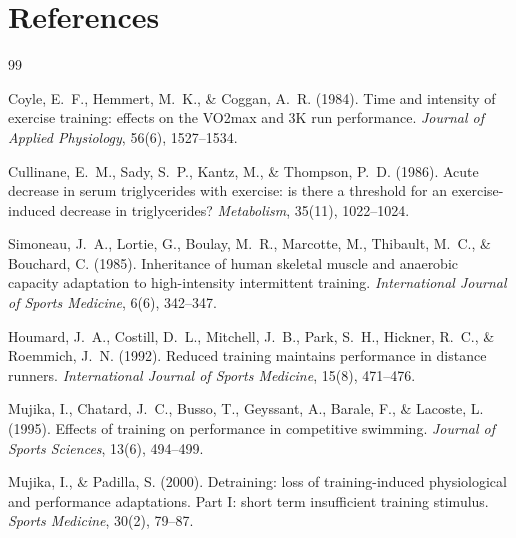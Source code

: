\documentclass[12pt,a4paper]{article}
\begin{document}
\section*{References}

\begin{thebibliography}{99}

Coyle, E.~F., Hemmert, M.~K., \& Coggan, A.~R. (1984).
Time and intensity of exercise training: effects on the VO2max and 3K run performance.
\textit{Journal of Applied Physiology}, 56(6), 1527--1534.

Cullinane, E.~M., Sady, S.~P., Kantz, M., \& Thompson, P.~D. (1986).
Acute decrease in serum triglycerides with exercise: is there a threshold for an exercise-induced decrease in triglycerides?
\textit{Metabolism}, 35(11), 1022--1024.

Simoneau, J.~A., Lortie, G., Boulay, M.~R., Marcotte, M., Thibault, M.~C., \& Bouchard, C. (1985).
Inheritance of human skeletal muscle and anaerobic capacity adaptation to high-intensity intermittent training.
\textit{International Journal of Sports Medicine}, 6(6), 342--347.

Houmard, J.~A., Costill, D.~L., Mitchell, J.~B., Park, S.~H., Hickner, R.~C., \& Roemmich, J.~N. (1992).
Reduced training maintains performance in distance runners.
\textit{International Journal of Sports Medicine}, 15(8), 471--476.

Mujika, I., Chatard, J.~C., Busso, T., Geyssant, A., Barale, F., \& Lacoste, L. (1995).
Effects of training on performance in competitive swimming.
\textit{Journal of Sports Sciences}, 13(6), 494--499.

Mujika, I., \& Padilla, S. (2000).
Detraining: loss of training-induced physiological and performance adaptations. Part I: short term insufficient training stimulus.
\textit{Sports Medicine}, 30(2), 79--87.

\end{thebibliography}
\end{document}
